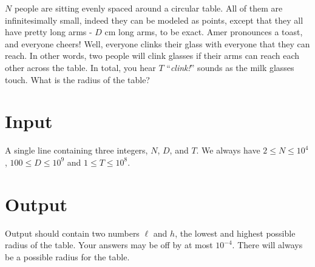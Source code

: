 $N$ people are sitting evenly spaced around a circular table. All of them are infinitesimally small, indeed they can be modeled as points, except that they all have pretty long arms - $D$ cm long arms, to be exact. Amer pronounces a toast, and everyone cheers! Well, everyone clinks their glass with everyone that they can reach. In other words, two people will clink glasses if their arms can reach each other across the table. In total, you hear $T$ ``{\em clink!}'' sounds as the milk glasses touch. What is the radius of the table? 

\section*{Input}
A single line containing three integers, $N$, $D$, and $T$.
%
We always have $2 \leq N \leq 10^4$, $100 \leq D \leq 10^9$ and $1 \leq T \leq 10^{8}$. 


\section*{Output}
Output should contain two numbers $\ell$ and $h$, the lowest and highest possible radius of the table. Your answers may be off by at most $10^{-4}$. There will always be a possible radius for the table.

